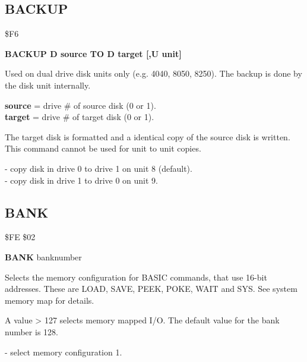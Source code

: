 
\newpage
\subsection{BACKUP}
\begin{description}[leftmargin=3cm,style=nextline]
\item [Token:] \$F6
\item [Format:] {\bf BACKUP D source TO D target [,U unit]}
\item [Usage:] Used on dual drive
   disk units only (e.g. 4040, 8050, 8250).
   The backup is done by the disk unit internally.

   {\bf source} = drive \# of source disk (0 or 1). \\
   {\bf target} = drive \# of target disk (0 or 1).

\item [Remarks:]  The target disk is formatted and
                 a identical copy of the source disk is written. \\
                 This command cannot be used for unit to unit copies.

\item [Example:]  - copy disk in drive 0 to
                   drive 1 on unit 8 (default).\\
                  - copy disk in drive 1 to
                   drive 0 on unit 9.
\end{description}


\newpage
\subsection{BANK}
\begin{description}[leftmargin=3cm,style=nextline]
\item [Token:] \$FE \$02
\item [Format:] {\bf BANK} banknumber
\item [Usage:] Selects the memory configuration
               for BASIC commands, that use 16-bit addresses.
               These are LOAD, SAVE, PEEK, POKE, WAIT and SYS.
               See system memory map for details.
\item [Remarks:] A value > 127 selects memory mapped I/O.
                 The default value for the bank number is 128.
\item [Example:]  - select memory configuration 1.
\end{description}

